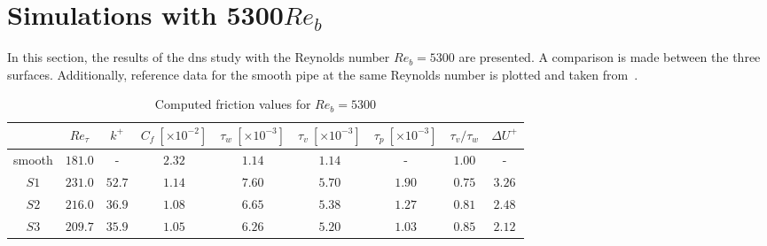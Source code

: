 \section{Simulations with 5300$Re_b$}
In this section, the results of the \acrshort{dns} study with the Reynolds number $Re_b = 5300$ are presented.
A comparison is made between the three surfaces. 
Additionally, reference data for the smooth pipe at the same Reynolds number is plotted and taken from~\cite{yaoDirectNumericalSimulations2023}.
\begin{table}
    \centering
    \caption[Computed friction values for $Re_b = 5300$]{Computed friction values for $Re_b = 5300$}
    \begin{tabular}{c c c c c c c c c}
        \toprule
                & $Re_\tau$ & $k^+$     & $C_f\ [\times10^{-2}]$ & $\tau_w\ [\times10^{-3}]$ & $\tau_v\ [\times10^{-3}]$ & $\tau_p\ [\times10^{-3}]$ & $\tau_v/\tau_w$   & $\Delta U^+$\\
        \midrule
        smooth  & $181.0$   & -         & $2.32$   & $1.14$   & $1.14$   & -                     & $1.00$           & - \\
        $S1$    & $231.0$   & $52.7$   & $1.14$   & $7.60$   & $5.70$   & $1.90$    & $0.75$           & $3.26$\\
        $S2$    & $216.0$   & $36.9$   & $1.08$   & $6.65$   & $5.38$   & $1.27$    & $0.81$           & $2.48$\\
        $S3$    & $209.7$   & $35.9$   & $1.05$   & $6.26$   & $5.20$   & $1.03$    & $0.85$           & $2.12$\\
        \bottomrule
    \end{tabular}
    
    \label{tab: friction values Reb 5300}
\end{table}
